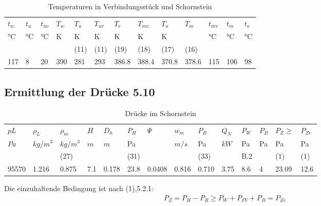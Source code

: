 \documentclass[a4paper,10pt,twoside]{article}
\begin{document}
\begin{landscape}
\begin{table}[htbp]
\caption{\label{tab:org023034d}
Temperaturen in Verbindungsstück und Schornstein}
\centering
\begin{tabular}{lllllllllllll}
\(t_w\) & \(t_u\) & \(t_{uv}\) & \(T_w\) & \(T_u\) & \(T_{uv}\) & \(T_e\) & \(T_{mv}\) & \(T_o\) & \(T_m\) & \(t_{mv}\) & \(t_m\) & \(t_o\)\\
°C & °C & °C & K & K & K & K & K & K &  & °C & °C & °C\\
 &  &  &  & (11) & (11) & (19) & (18) & (17) & (16) &  &  & \\
\hline
117 & 8 & 20 & 390 & 281 & 293 & 386.8 & 388.4 & 370.8 & 378.6 & 115 & 106 & 98\\
\end{tabular}
\end{table}

\end{landscape}

\subsection{Ermittlung der Drücke 5.10}
\label{sec:org6a06f11}
\begin{table}[htbp]
\caption{\label{tab:orgbcdd843}
Drücke im Schornstein}
\centering
\begin{tabular}{llllllllllllll}
\(pL\) & \(\rho_L\) & \(\rho_m\) & \(H\) & \(D_h\) & \(P_H\) & \(\Psi\) & \(w_m\) & \(P_R\) & \(Q_N\) & \(P_W\) & \(P_B\) & \(P_Z\ge\) & \(P_{Ze}\)\\
\(Pa\) & \(kg/m^3\) & \(kg/m^3\) & \(m\) & \(m\) & Pa &  & \(m/s\) & Pa & \(kW\) & Pa & Pa & Pa & Pa\\
 &  & (27) &  &  & (31) &  &  & (33) &  & B.2 &  & (1) & (1)\\
\hline
95570 & 1.216 & 0.875 & 7.1 & 0.178 & 23.8 & 0.0408 & 0.816 & 0.710 & 3.75 & 8.6 & 4 & 23.09 & 12.6\\
\end{tabular}
\end{table}


Die einzuhaltende Bedingung ist nach (1),5.2.1:
\begin{align}
  P_Z = P_H - P_R \ge P_W + P_{FV} + P_B = P_{Ze}
\end{align}










\end{document}
